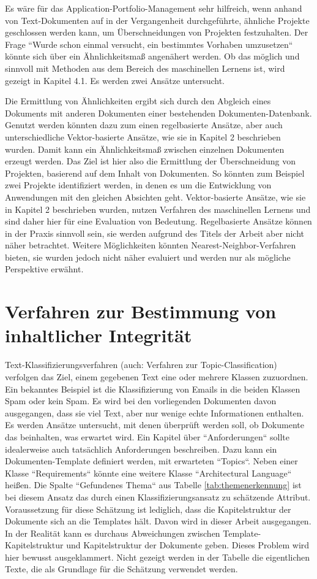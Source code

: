 Es wäre für das Application-Portfolio-Management sehr hilfreich, wenn anhand von Text-Dokumenten auf in der Vergangenheit durchgeführte, ähnliche Projekte geschlossen werden kann, um Überschneidungen von Projekten festzuhalten. Der Frage ``Wurde schon einmal versucht, ein bestimmtes Vorhaben umzusetzen`` könnte sich über ein Ähnlichkeitsmaß angenähert werden. Ob das möglich und sinnvoll mit Methoden aus dem Bereich des maschinellen Lernens ist, wird gezeigt in Kapitel 4.1. Es werden zwei Ansätze untersucht.

Die Ermittlung von Ähnlichkeiten ergibt sich durch den Abgleich eines Dokuments mit anderen Dokumenten einer bestehenden Dokumenten-Datenbank. Genutzt werden könnten dazu zum einen regelbasierte Ansätze, aber auch unterschiedliche Vektor-basierte Ansätze, wie sie in Kapitel 2 beschrieben wurden. Damit kann ein Ähnlichkeitsmaß zwischen einzelnen Dokumenten erzeugt werden. Das Ziel ist hier also die Ermittlung der Überschneidung von Projekten, basierend auf dem Inhalt von Dokumenten. So könnten zum Beispiel zwei Projekte identifiziert werden, in denen es um die Entwicklung von Anwendungen mit den gleichen Absichten geht. Vektor-basierte Ansätze, wie sie in Kapitel 2 beschrieben wurden, nutzen Verfahren des maschinellen Lernens und sind daher hier für eine Evaluation von Bedeutung. Regelbasierte Ansätze können in der Praxis sinnvoll sein, sie werden aufgrund des Titels der Arbeit aber nicht näher betrachtet. Weitere Möglichkeiten könnten Nearest-Neighbor-Verfahren bieten, sie wurden jedoch nicht näher evaluiert und werden nur als mögliche Perspektive erwähnt.

\section{Verfahren zur Bestimmung von inhaltlicher Integrität}

Text-Klassifizierungsverfahren (auch: Verfahren zur Topic-Classification) verfolgen das Ziel, einem gegebenen Text eine oder mehrere Klassen zuzuordnen. Ein bekanntes Beispiel ist die Klassifizierung von Emails in die beiden Klassen Spam oder kein Spam. \cite{Gupta} Es wird bei den vorliegenden Dokumenten davon ausgegangen, dass sie viel Text, aber nur wenige echte Informationen enthalten. 
Es werden Ansätze untersucht, mit denen überprüft werden soll, ob Dokumente das beinhalten, was erwartet wird. Ein Kapitel über ``Anforderungen`` sollte idealerweise auch tatsächlich Anforderungen beschreiben.
Dazu kann ein Dokumenten-Template definiert werden, mit erwarteten ``Topics``. Neben einer Klasse ``Requirements`` könnte eine weitere Klasse ``Architectural Language`` heißen. Die Spalte ``Gefundenes Thema`` aus Tabelle \ref{tab:themenerkennung} ist bei diesem Ansatz das durch einen Klassifizierungsansatz zu schätzende Attribut. Voraussetzung für diese Schätzung ist lediglich, dass die Kapitelstruktur der Dokumente sich an die Templates hält. Davon wird in dieser Arbeit ausgegangen. In der Realität kann es durchaus Abweichungen zwischen Template-Kapitelstruktur und Kapitelstruktur der Dokumente geben. Dieses Problem wird hier bewusst ausgeklammert. Nicht gezeigt werden in der Tabelle die eigentlichen Texte, die als Grundlage für die Schätzung verwendet werden. 

